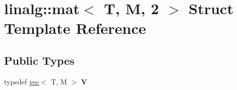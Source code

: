 \hypertarget{structlinalg_1_1mat_3_01T_00_01M_00_012_01_4}{}\section{linalg\+:\+:mat$<$ T, M, 2 $>$ Struct Template Reference}
\label{structlinalg_1_1mat_3_01T_00_01M_00_012_01_4}
\subsection*{Public Types}
\begin{DoxyCompactItemize}
\item 
typedef \hyperlink{structlinalg_1_1vec}{vec}$<$ T, M $>$ {\bfseries V}\hypertarget{structlinalg_1_1mat_3_01T_00_01M_00_012_01_4_adab251aa8e42cbe8d21aa754e49f10ac}{}\label{structlinalg_1_1mat_3_01T_00_01M_00_012_01_4_adab251aa8e42cbe8d21aa754e49f10ac}

\end{DoxyCompactItemize}
